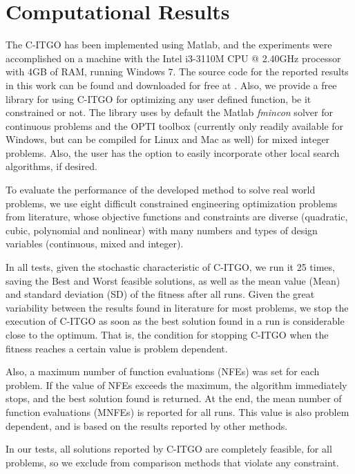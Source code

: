 \section{Computational Results} \label{sec:Results}

The C-ITGO has been implemented using Matlab, and the experiments were accomplished on a machine with the Intel i3-3110M CPU @ 2.40GHz processor with 4GB of RAM, running Windows 7. The source code for the reported results in this work can be found and downloaded for free at \cite{GIT}. Also, we provide a free library for using C-ITGO for optimizing any user defined function, be it constrained or not. The library uses by default the Matlab \textit{fmincon} solver for continuous problems and the OPTI toolbox (currently only readily available for Windows, but can be compiled for Linux and Mac as well) for mixed integer problems. Also, the user has the option to easily incorporate other local search algorithms, if desired.

To evaluate the performance of the developed method to solve real world problems, we use eight difficult constrained engineering optimization problems from literature, whose objective functions and constraints are diverse (quadratic, cubic, polynomial and nonlinear) with many numbers and types of design variables (continuous, mixed and integer). 

In all tests, given the stochastic characteristic of C-ITGO, we run it 25 times, saving the Best and Worst feasible solutions, as well as the mean value (Mean) and standard deviation (SD) of the fitness after all runs. Given the great variability between the results found in literature for most problems, we stop the execution of C-ITGO as soon as the best solution found in a run is considerable close to the optimum. That is, the condition for stopping C-ITGO when the fitness reaches a certain value is problem dependent.

Also, a maximum number of function evaluations (NFEs) was set for each problem. If the value of NFEs exceeds the maximum, the algorithm immediately stops, and the best solution found is returned. At the end, the mean number of function evaluations (MNFEs) is reported for all runs. This value is also problem dependent, and is based on the results reported by other methods.

In our tests, all solutions reported by C-ITGO are completely feasible, for all problems, so we exclude from comparison methods that violate any constraint.

